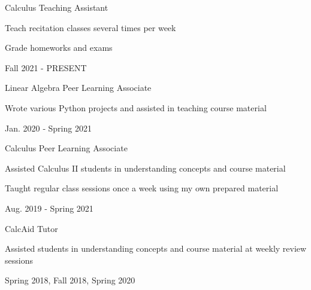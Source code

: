 


\begin{cventries}





  \cventrysubteaching
    {Calculus Teaching Assistant}
    {
      \begin{cvitems}
        \item {Teach recitation classes several times per week}
        \item {Grade homeworks and exams}
      \end{cvitems}
    }
    {Fall 2021 - PRESENT}




  \cventrysubteaching
    {Linear Algebra Peer Learning Associate}
    {
      \begin{cvitems}
        \item {Wrote various Python projects and assisted in teaching course material}
      \end{cvitems}
    }
    {Jan. 2020 ‑ Spring 2021}


  \cventrysubteaching
    {Calculus Peer Learning Associate}
    {
      \begin{cvitems}
        \item {Assisted Calculus II students in understanding concepts and course material}
        \item {Taught regular class sessions once a week using my own prepared material}
      \end{cvitems}
    }
    {Aug. 2019 ‑ Spring 2021}


  \cventrysubteaching
    {CalcAid Tutor}
    {
      \begin{cvitems}
        \item {Assisted students in understanding concepts and course material at weekly review sessions}
      \end{cvitems}
    }
    {Spring 2018, Fall 2018, Spring 2020}



\end{cventries}
